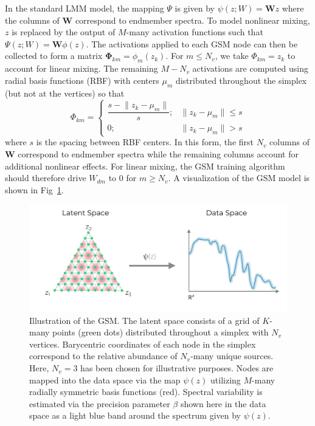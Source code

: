 \documentclass[remotesensing,article,submit,pdftex,moreauthors]{Definitions/mdpi}
\begin{document}
In the standard LMM model, the mapping $\Psi$ is given by $\psi(z;W) = \mathbf{W}z$ where the columns of $\mathbf{W}$ correspond to endmember spectra. To model nonlinear mixing, $z$ is replaced by the output of $M$-many activation functions such that $\Psi(z;W) = \mathbf{W}\phi(z)$. The activations applied to each GSM node can then be collected to form a matrix 
 $\mathbf{\Phi}_{km} = \phi_m(z_k)$. For $m \leq N_v$, we take $\Phi_{km} = z_k$ to account for linear mixing. The remaining  $M-N_v$ activations are computed using radial basis functions (RBF) with centers $\mu_m$ distributed throughout the simplex (but not at the vertices) so that 
\begin{equation}\label{eq:act-function}
    \Phi_{km} = \begin{cases}
        \dfrac{s - \lVert z_k - \mu_m \rVert}{s}; & \lVert z_k - \mu_m \rVert \leq s \\
        0; & \lVert z_k - \mu_m \rVert > s
    \end{cases}
\end{equation}
where $s$ is the spacing between RBF centers. In this form, the first $N_v$ columns of $\mathbf{W}$ correspond to endmember spectra while the remaining columns account for additional nonlinear effects. For linear mixing, the GSM training algorithm should therefore drive $W_{dm}$ to $0$ for $m\geq N_v$. A visualization of the GSM model is shown in Fig~\ref{fig:gsm-diagram}.

\begin{figure}[H]
\includegraphics[width=\columnwidth]{methods/gsm/gsm-diagram.pdf}
\caption{Illustration of the GSM. The latent space consists of a grid of $K$-many points (green dots) distributed throughout a simplex with $N_v$ vertices. Barycentric coordinates of each node in the simplex correspond to the relative abundance of $N_v$-many unique sources. Here, $N_v=3$ has been chosen for illustrative purposes. Nodes are mapped into the data space via the map $\psi(z)$ utilizing $M$-many radially symmetric basis functions (red). Spectral variability is estimated via the precision parameter $\beta$ shown here in the data space as a light blue band around the spectrum given by $\psi(z)$.}
\label{fig:gsm-diagram}
\end{figure}  
\end{document}

